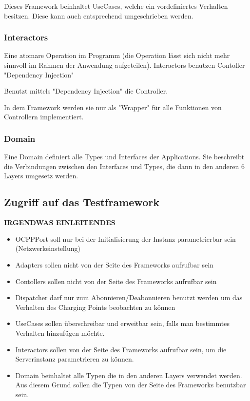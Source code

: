         Dieses Framework beinhaltet UseCases, welche ein vordefiniertes Verhalten besitzen. 
        Diese kann auch entsprechend umgeschrieben werden.
        \subsubsection{Interactors}
        Eine atomare Operation im Programm (die Operation lässt sich nicht mehr sinnvoll im Rahmen der Anwendung aufgeteilen).
        Interactors benutzen Contoller "Dependency Injection"
        
        Benutzt mittels "Dependency Injection" die Controller.

        In dem Framework werden sie nur als "Wrapper" für alle Funktionen von Controllern implementiert.
        \subsubsection{Domain}
        Eine Domain definiert alle Types und Interfaces der Applications.
        Sie beschreibt die Verbindungen zwischen den Interfaces und Types, die dann in den anderen 6 Layers umgesetz werden.

    \subsection{Zugriff auf das Testframework}
    \textbf{IRGENDWAS EINLEITENDES}
    \begin{itemize}
        \item OCPPPort soll nur bei der Initialisierung der Instanz parametrierbar sein (Netzwerkeinstellung)
        \item Adapters sollen nicht von der Seite des Frameworks aufrufbar sein
        \item Contollers sollen nicht von der Seite des Frameworks aufrufbar sein
        \item Dispatcher darf nur zum Abonnieren/Deabonnieren benutzt werden um das Verhalten des Charging Points beobachten zu können
        \item UseCases sollen überschreibar und erweitbar sein, falls man bestimmtes Verhalten hinzufügen möchte.
        \item Interactors sollen von der Seite des Frameworks aufrufbar sein, um die Serverinstanz parametrieren zu können.
        \item Domain beinhaltet alle Typen die in den anderen Layers verwendet werden. Aus diesem Grund sollen die Typen von der Seite des Frameworks benutzbar sein.
    \end{itemize}

